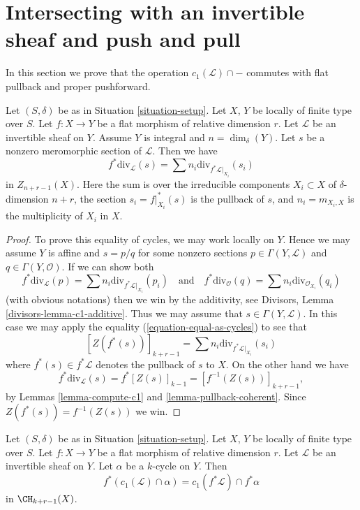 \section{Intersecting with an invertible sheaf and push and pull}
\label{section-intersecting-with-divisors-push-pull}

\noindent
In this section we prove that the operation $c_1(\mathcal{L}) \cap -$
commutes with flat pullback and proper pushforward.

\begin{lemma}
\label{lemma-prepare-flat-pullback-cap-c1}
Let $(S, \delta)$ be as in Situation \ref{situation-setup}.
Let $X$, $Y$ be locally of finite type over $S$.
Let $f : X \to Y$ be a flat morphism of relative dimension $r$.
Let $\mathcal{L}$ be an invertible sheaf on $Y$.
Assume $Y$ is integral and $n = \dim_\delta(Y)$.
Let $s$ be a nonzero meromorphic section of $\mathcal{L}$.
Then we have
$$
f^*\text{div}_\mathcal{L}(s) = \sum n_i\text{div}_{f^*\mathcal{L}|_{X_i}}(s_i)
$$
in $Z_{n + r - 1}(X)$. Here the sum is over the irreducible
components $X_i \subset X$ of $\delta$-dimension $n + r$,
the section $s_i = f|_{X_i}^*(s)$ is the pullback of $s$, and
$n_i = m_{X_i, X}$ is the multiplicity of $X_i$ in $X$.
\end{lemma}

\begin{proof}
To prove this equality of cycles, we may work locally on $Y$.
Hence we may assume $Y$ is affine and $s = p/q$ for some nonzero
sections $p \in \Gamma(Y, \mathcal{L})$ and $q \in \Gamma(Y, \mathcal{O})$.
If we can show both
$$
f^*\text{div}_\mathcal{L}(p) =
\sum n_i\text{div}_{f^*\mathcal{L}|_{X_i}}(p_i)
\quad\text{and}\quad
f^*\text{div}_\mathcal{O}(q) =
\sum n_i\text{div}_{\mathcal{O}_{X_i}}(q_i)
$$
(with obvious notations) then we win by the
additivity, see Divisors, Lemma \ref{divisors-lemma-c1-additive}.
Thus we may assume that $s \in \Gamma(Y, \mathcal{L})$.
In this case we may apply the equality
(\ref{equation-equal-as-cycles}) to see that
$$
[Z(f^*(s))]_{k + r - 1} =
\sum n_i\text{div}_{f^*\mathcal{L}|_{X_i}}(s_i)
$$
where $f^*(s) \in f^*\mathcal{L}$ denotes the pullback of $s$ to $X$.
On the other hand we have
$$
f^*\text{div}_\mathcal{L}(s) = f^*[Z(s)]_{k - 1}
= [f^{-1}(Z(s))]_{k + r - 1},
$$
by Lemmas \ref{lemma-compute-c1} and \ref{lemma-pullback-coherent}.
Since $Z(f^*(s)) = f^{-1}(Z(s))$ we win.
\end{proof}

\begin{lemma}
\label{lemma-flat-pullback-cap-c1}
Let $(S, \delta)$ be as in Situation \ref{situation-setup}.
Let $X$, $Y$ be locally of finite type over $S$.
Let $f : X \to Y$ be a flat morphism of relative dimension $r$.
Let $\mathcal{L}$ be an invertible sheaf on $Y$.
Let $\alpha$ be a $k$-cycle on $Y$.
Then
$$
f^*(c_1(\mathcal{L}) \cap \alpha) = c_1(f^*\mathcal{L}) \cap f^*\alpha
$$
in $\CH_{k + r - 1}(X)$.
\end{lemma}

